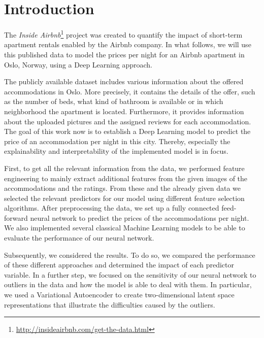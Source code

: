 \section{Introduction}


The \emph{Inside Airbnb}\footnote{\url{http://insideairbnb.com/get-the-data.html}} project \citep{cox2022} was created to quantify the impact of short-term apartment rentals enabled by the Airbnb company.
In what follows, we will use this published data to model the prices per night for an Airbnb apartment in Oslo, Norway, using a Deep Learning approach.

The publicly available dataset includes various information about the offered accommodations in Oslo.
More precisely, it contains the details of the offer, such as the number of beds, what kind of bathroom is available or in which neighborhood the apartment is located.
Furthermore, it provides information about the uploaded pictures and the assigned reviews for each accommodation.
The goal of this work now is to establish a Deep Learning model to predict the price of an accommodation per night in this city.
Thereby, especially the explainability and interpretability of the implemented model is in focus.

First, to get all the relevant information from the data, we performed feature engineering to mainly extract additional features from the given images of the accommodations and the ratings.
From these and the already given data we selected the relevant predictors for our model using different feature selection algorithms.
After preprocessing the data, we set up a fully connected feed-forward neural network to predict the prices of the accommodations per night.
We also implemented several classical Machine Learning models to be able to evaluate the performance of our neural network.

Subsequently, we considered the results.
To do so, we compared the performance of these different approaches and determined the impact of each predictor variable.
In a further step, we focused on the sensitivity of our neural network to outliers in the data and how the model is able to deal with them.
In particular, we used a Variational Autoencoder to create two-dimensional latent space representations that illustrate the difficulties caused by the outliers.

